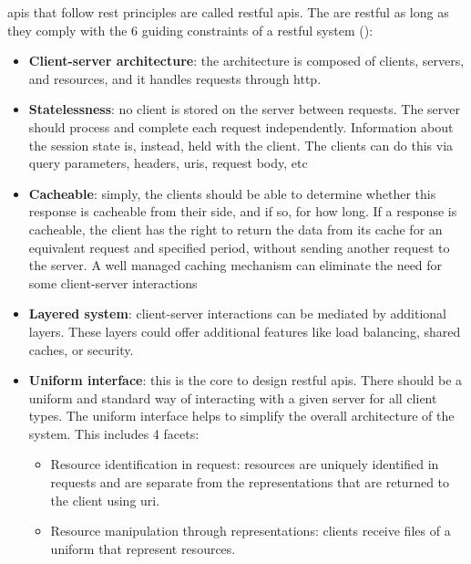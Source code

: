 \begin{multicols}{2}
      \acrshort{api}s that follow \acrshort{rest} principles are called \acrshort{rest}ful \acrshort{api}s. The
      are \acrshort{rest}ful as long as they comply with the 6 guiding constraints of a \acrshort{rest}ful system
      (\cite{restguidingprinciples}):
      \begin{itemize}
            \item \textbf{Client-server architecture}: the architecture is composed of clients, servers, and
                  resources, and it handles requests through \acrshort{http}.
            \item \textbf{Statelessness}: no client is stored on the server between requests. The server should
                  process and complete each request independently. Information about the session state is, instead,
                  held with the client. The clients can do this via query parameters, headers, \acrshort{uri}s,
                  request body, \acrshort{etc}
            \item \textbf{Cacheable}: simply, the clients should be able to determine whether this response is cacheable
                  from their side, and if so, for how long. If a response is cacheable, the client has the right to return the
                  data from its cache for an equivalent request and specified period, without sending another request to the
                  server. A well managed caching mechanism can eliminate the need for some client-server interactions
            \item \textbf{Layered system}: client-server interactions can be mediated by additional layers. These
                  layers could offer additional features like load balancing, shared caches, or security.
            \item \textbf{Uniform interface}: this is the core to design \acrshort{rest}ful \acrshort{api}s.
                  There should be a uniform and standard way of interacting with a given server for all client
                  types. The uniform interface helps to simplify the overall architecture of the system. This includes
                  4 facets:
                  \begin{itemize}
                        \item Resource identification in request: resources are uniquely identified in requests and are separate
                              from the representations that are returned to the client using \acrshort{uri}.
                        \item Resource manipulation through representations: clients receive files of a uniform that represent resources.

\end{itemize}
\end{itemize}
\end{multicols}
